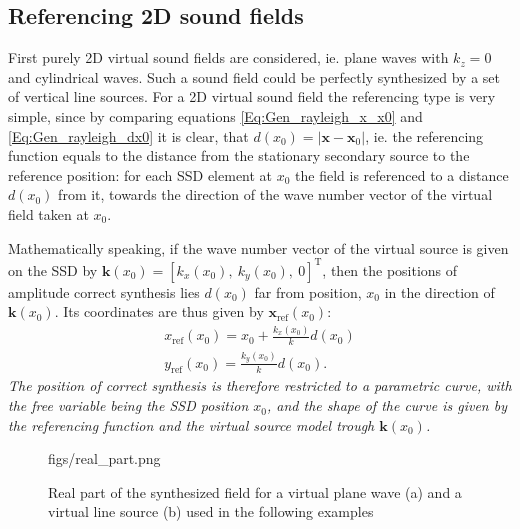 \documentclass[12pt,a4paper]{article}
\newcommand{\vx}{\mathbf{x}}
\newcommand{\vxo}{\mathbf{x}_0}
\begin{document}
\subsection{Referencing 2D sound fields}

First purely 2D virtual sound fields are considered, ie. plane waves with $k_z=0$ and cylindrical waves. Such a sound field could be perfectly synthesized by a set of vertical line sources.
For a 2D virtual sound field the referencing type is very simple, since by comparing equations \ref{Eq:Gen_rayleigh_x_x0} and \eqref{Eq:Gen_rayleigh_dx0} it is clear, that $d(x_0) = |\vx-\vxo|$, ie. the referencing function equals to the distance from the stationary secondary source to the reference position: for each SSD element at $x_0$ the field is referenced to a distance $d(x_0)$ from it, towards the direction of the wave number vector of the virtual field taken at $x_0$.

Mathematically speaking, if the wave number vector of the virtual source is given on the SSD by $\mathbf{k}(x_0) = [k_x(x_0),\ k_y(x_0),\ 0]^{\mathrm{T}}$, then the positions of amplitude correct synthesis lies $d(x_0)$ far from position, $x_0$ in the direction of $\mathbf{k}(x_0)$. Its coordinates are thus given by $\mathbf{x}_{\mathrm{ref}}(x_0)$:
\begin{eqnarray}
x_{\mathrm{ref}}(x_0) = x_0 + \frac{k_x(x_0)}{k} d(x_0) \\
y_{\mathrm{ref}}(x_0) = \frac{k_y(x_0)}{k} d(x_0).
\end{eqnarray}
\emph{The position of correct synthesis is therefore restricted to a parametric curve, with the free variable being the SSD position $x_0$, and the shape of the curve is given by the referencing function and the virtual source model trough $\mathbf{k}(x_0)$.}

\begin{figure}
	\centering
	\begin{overpic}[width = 1\columnwidth ]{figs/real_part.png}
	\scriptsize
	\end{overpic}
\caption{Real part of the synthesized field for a virtual plane wave (a) and a virtual line source (b) used in the following examples}
	\label{Fig:Theory:Real_part}
\end{figure}
\end{document}
